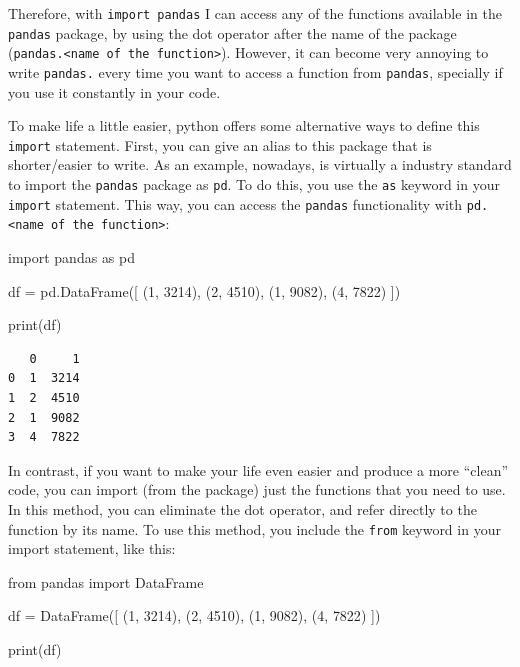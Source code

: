 \documentclass[
  11pt,
  letterpaper,
  DIV=11,
  numbers=noendperiod]{scrreprt}
\newenvironment{Shaded}{\begin{snugshade}}{\end{snugshade}}
\newcommand{\BuiltInTok}[1]{\textcolor[rgb]{0.00,0.23,0.31}{#1}}
\newcommand{\DecValTok}[1]{\textcolor[rgb]{0.68,0.00,0.00}{#1}}
\newcommand{\ImportTok}[1]{\textcolor[rgb]{0.00,0.46,0.62}{#1}}
\newcommand{\NormalTok}[1]{\textcolor[rgb]{0.00,0.23,0.31}{#1}}
\newcommand{\OperatorTok}[1]{\textcolor[rgb]{0.37,0.37,0.37}{#1}}
\begin{document}
Therefore, with \texttt{import\ pandas} I can access any of the
functions available in the \texttt{pandas} package, by using the dot
operator after the name of the package
(\texttt{pandas.\textless{}name\ of\ the\ function\textgreater{}}).
However, it can become very annoying to write \texttt{pandas.} every
time you want to access a function from \texttt{pandas}, specially if
you use it constantly in your code.

To make life a little easier, python offers some alternative ways to
define this \texttt{import} statement. First, you can give an alias to
this package that is shorter/easier to write. As an example, nowadays,
is virtually a industry standard to import the \texttt{pandas} package
as \texttt{pd}. To do this, you use the \texttt{as} keyword in your
\texttt{import} statement. This way, you can access the \texttt{pandas}
functionality with
\texttt{pd.\textless{}name\ of\ the\ function\textgreater{}}:

\begin{Shaded}
\begin{Highlighting}[]
\ImportTok{import}\NormalTok{ pandas }\ImportTok{as}\NormalTok{ pd}

\NormalTok{df }\OperatorTok{=}\NormalTok{ pd.DataFrame([}
\NormalTok{  (}\DecValTok{1}\NormalTok{, }\DecValTok{3214}\NormalTok{), (}\DecValTok{2}\NormalTok{, }\DecValTok{4510}\NormalTok{), }
\NormalTok{  (}\DecValTok{1}\NormalTok{, }\DecValTok{9082}\NormalTok{), (}\DecValTok{4}\NormalTok{, }\DecValTok{7822}\NormalTok{)}
\NormalTok{])}

\BuiltInTok{print}\NormalTok{(df)}
\end{Highlighting}
\end{Shaded}

\begin{verbatim}
   0     1
0  1  3214
1  2  4510
2  1  9082
3  4  7822
\end{verbatim}

In contrast, if you want to make your life even easier and produce a
more ``clean'' code, you can import (from the package) just the
functions that you need to use. In this method, you can eliminate the
dot operator, and refer directly to the function by its name. To use
this method, you include the \texttt{from} keyword in your import
statement, like this:

\begin{Shaded}
\begin{Highlighting}[]
\ImportTok{from}\NormalTok{ pandas }\ImportTok{import}\NormalTok{ DataFrame}

\NormalTok{df }\OperatorTok{=}\NormalTok{ DataFrame([}
\NormalTok{  (}\DecValTok{1}\NormalTok{, }\DecValTok{3214}\NormalTok{), (}\DecValTok{2}\NormalTok{, }\DecValTok{4510}\NormalTok{), }
\NormalTok{  (}\DecValTok{1}\NormalTok{, }\DecValTok{9082}\NormalTok{), (}\DecValTok{4}\NormalTok{, }\DecValTok{7822}\NormalTok{)}
\NormalTok{])}

\BuiltInTok{print}\NormalTok{(df)}
\end{Highlighting}
\end{Shaded}
\end{document}
